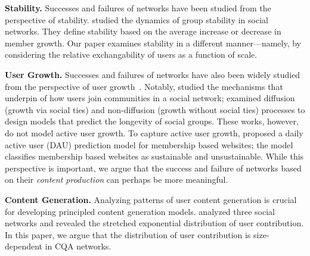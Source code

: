 \textbf{Stability.} Successes and failures of networks have been studied from the perspective of stability. \citet{patil2013} studied the dynamics of group stability in social networks. They define stability based on the average increase or decrease in member growth. Our paper examines stability in a different manner---namely, by considering the relative exchangability of users as a function of scale.

\textbf{User Growth.} Successes and failures of networks have also been widely studied from the perspective of user growth~\cite{Kumar2006, Backstrom2006, kairam2012, zang2016}. Notably, \citet{Backstrom2006} studied the mechanisms that underpin of how users join communities in a social network; \citet{kairam2012} examined diffusion (growth via social ties) and non-diffusion (growth without social ties) processes to design models that predict the longevity of social groups. These works, however, do not model active user growth. To capture active user growth, \citet{Ribeiro2014} proposed a daily active user (DAU) prediction model for membership based websites; the model classifies membership based websites as sustainable and unsustainable. While this perspective is important, we argue that the success and failure of networks based on their \emph{content production} can perhaps be more meaningful.

\textbf{Content Generation.} Analyzing patterns of user content generation is crucial for developing principled content generation models. \citet{Guo2009} analyzed three social networks and revealed the stretched exponential distribution of user contribution. In this paper, we argue that the distribution of user contribution is size-dependent in CQA networks.



